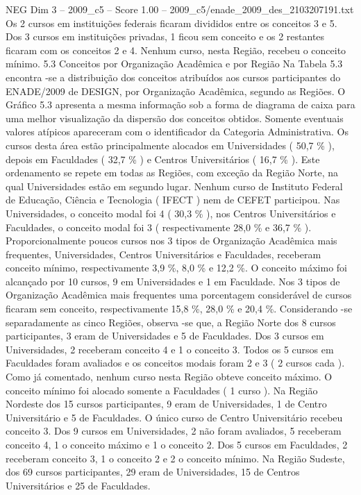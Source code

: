 \begin{textsample}{NEG Dim 3 – 2009\_c5 – Score 1.00 – 2009\_c5/enade\_2009\_des\_2103207191.txt}
Os 2 cursos em instituições federais ficaram divididos entre os conceitos 3 e 5.
Dos 3 cursos em instituições privadas, 1 ficou sem conceito e os 2 restantes ficaram com os conceitos 2 e 4.
Nenhum curso, nesta Região, recebeu o conceito mínimo. 5.3 Conceitos por Organização Acadêmica e por Região Na Tabela 5.3 encontra -se a distribuição dos conceitos atribuídos aos cursos participantes do ENADE/2009 de DESIGN, por Organização Acadêmica, segundo as Regiões.
O Gráfico 5.3 apresenta a mesma informação sob a forma de diagrama de caixa para uma melhor visualização da dispersão dos conceitos obtidos.
Somente eventuais valores atípicos apareceram com o identificador da Categoria Administrativa.
Os cursos desta área estão principalmente alocados em Universidades ( 50,7 \% ), depois em Faculdades ( 32,7 \% ) e Centros Universitários ( 16,7 \% ).
Este ordenamento se repete em todas as Regiões, com exceção da Região Norte, na qual Universidades estão em segundo lugar.
Nenhum curso de Instituto Federal de Educação, Ciência e Tecnologia ( IFECT ) nem de CEFET participou.
Nas Universidades, o conceito modal foi 4 ( 30,3 \% ), nos Centros Universitários e Faculdades, o conceito modal foi 3 ( respectivamente 28,0 \% e 36,7 \% ).
Proporcionalmente poucos cursos nos 3 tipos de Organização Acadêmica mais frequentes, Universidades, Centros Universitários e Faculdades, receberam conceito mínimo, respectivamente 3,9 \%, 8,0 \% e 12,2 \%.
O conceito máximo foi alcançado por 10 cursos, 9 em Universidades e 1 em Faculdade.
Nos 3 tipos de Organização Acadêmica mais frequentes uma porcentagem considerável de cursos ficaram sem conceito, respectivamente 15,8 \%, 28,0 \% e 20,4 \%.
Considerando -se separadamente as cinco Regiões, observa -se que, a Região Norte dos 8 cursos participantes, 3 eram de Universidades e 5 de Faculdades.
Dos 3 cursos em Universidades, 2 receberam conceito 4 e 1 o conceito 3.
Todos os 5 cursos em Faculdades foram avaliados e os conceitos modais foram 2 e 3 ( 2 cursos cada ).
Como já comentado, nenhum curso nesta Região obteve conceito máximo.
O conceito mínimo foi alocado somente a Faculdades ( 1 curso ).
Na Região Nordeste dos 15 cursos participantes, 9 eram de Universidades, 1 de Centro Universitário e 5 de Faculdades.
O único curso de Centro Universitário recebeu conceito 3.
Dos 9 cursos em Universidades, 2 não foram avaliados, 5 receberam conceito 4, 1 o conceito máximo e 1 o conceito 2.
Dos 5 cursos em Faculdades, 2 receberam conceito 3, 1 o conceito 2 e 2 o conceito mínimo.
Na Região Sudeste, dos 69 cursos participantes, 29 eram de Universidades, 15 de Centros Universitários e 25 de Faculdades.

\end{textsample}
